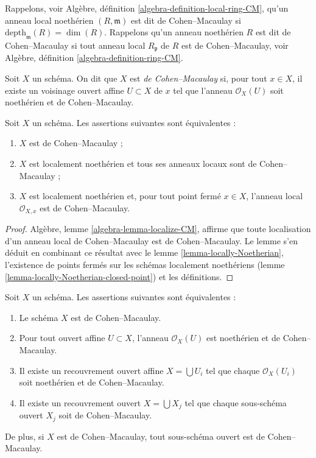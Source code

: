 \noindent
Rappelons, voir Algèbre, définition \ref{algebra-definition-local-ring-CM},
qu'un anneau local noethérien $(R, \mathfrak m)$ est
dit de Cohen--Macaulay si $\text{depth}_{\mathfrak m}(R) = \dim(R)$.
Rappelons qu'un anneau noethérien $R$ est dit de Cohen--Macaulay si
tout anneau local $R_{\mathfrak p}$ de $R$ est de Cohen--Macaulay,
voir Algèbre, définition \ref{algebra-definition-ring-CM}.

\begin{definition}
\label{definition-Cohen-Macaulay}
Soit $X$ un schéma. On dit que $X$ est {\it de Cohen--Macaulay} si,
pour tout $x \in X$, il existe un voisinage ouvert affine
$U \subset X$ de $x$ tel que l'anneau $\mathcal{O}_X(U)$ soit
noethérien et de Cohen--Macaulay.
\end{definition}

\begin{lemma}
\label{lemma-characterize-Cohen-Macaulay}
Soit $X$ un schéma. Les assertions suivantes sont équivalentes :
\begin{enumerate}
\item $X$ est de Cohen--Macaulay ;
\item $X$ est localement noethérien et tous ses anneaux locaux sont de Cohen--Macaulay ;

\item $X$ est localement noethérien et, pour tout point fermé $x \in X$,
l'anneau local $\mathcal{O}_{X, x}$ est de Cohen--Macaulay.
\end{enumerate}
\end{lemma}

\begin{proof}
Algèbre, lemme \ref{algebra-lemma-localize-CM}, affirme que toute localisation
d'un anneau local de Cohen--Macaulay est de Cohen--Macaulay. Le lemme s'en déduit
en combinant ce résultat avec le lemme \ref{lemma-locally-Noetherian},
l'existence de points
fermés sur les schémas localement noethériens
(lemme \ref{lemma-locally-Noetherian-closed-point}) et
les définitions.
\end{proof}

\begin{lemma}
\label{lemma-locally-Cohen-Macaulay}
Soit $X$ un schéma. Les assertions suivantes sont équivalentes :
\begin{enumerate}
\item Le schéma $X$ est de Cohen--Macaulay.
\item Pour tout ouvert affine $U \subset X$, l'anneau $\mathcal{O}_X(U)$
est noethérien et de Cohen--Macaulay.
\item Il existe un recouvrement ouvert affine $X = \bigcup U_i$ tel que
chaque $\mathcal{O}_X(U_i)$ soit noethérien et de Cohen--Macaulay.
\item Il existe un recouvrement ouvert $X = \bigcup X_j$
tel que chaque sous-schéma ouvert $X_j$ soit de Cohen--Macaulay.
\end{enumerate}
De plus, si $X$ est de Cohen--Macaulay, tout sous-schéma ouvert
est de Cohen--Macaulay.
\end{lemma}

